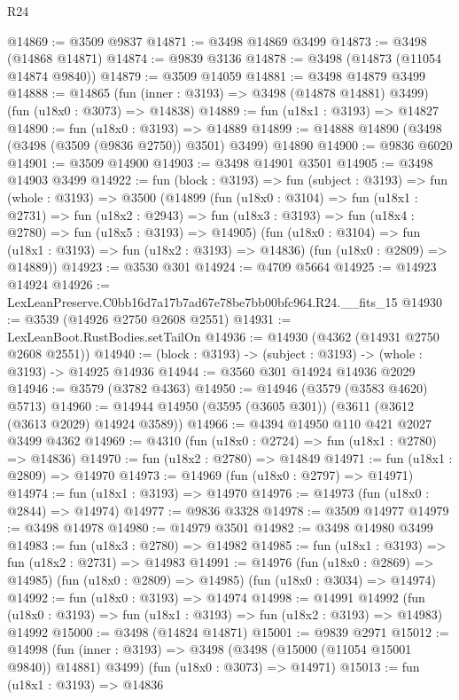 \begin{lexlean}{R24}
\begin{coremodule}
@14869 := @3509 @9837
@14871 := @3498 @14869 @3499
@14873 := @3498 (@14868 @14871)
@14874 := @9839 @3136
@14878 := @3498 (@14873 (@11054 @14874 @9840))
@14879 := @3509 @14059
@14881 := @3498 @14879 @3499
@14888 := @14865
    (fun (inner : @3193) => @3498 (@14878 @14881) @3499)
    (fun (u18x0 : @3073) => @14838)
@14889 := fun (u18x1 : @3193) => @14827
@14890 := fun (u18x0 : @3193) => @14889
@14899 := @14888 @14890 (@3498 (@3498 (@3509 (@9836 @2750)) @3501) @3499) @14890
@14900 := @9836 @6020
@14901 := @3509 @14900
@14903 := @3498 @14901 @3501
@14905 := @3498 @14903 @3499
@14922 := fun (block : @3193) =>
  fun (subject : @3193) =>
  fun (whole : @3193) =>
  @3500
    (@14899
      (fun (u18x0 : @3104) =>
      fun (u18x1 : @2731) =>
      fun (u18x2 : @2943) =>
      fun (u18x3 : @3193) => fun (u18x4 : @2780) => fun (u18x5 : @3193) => @14905)
      (fun (u18x0 : @3104) => fun (u18x1 : @3193) => fun (u18x2 : @3193) => @14836)
      (fun (u18x0 : @2809) => @14889))
@14923 := @3530 @301
@14924 := @4709 @5664
@14925 := @14923 @14924
@14926 := LexLeanPreserve.C0bb16d7a17b7ad67e78be7bb00bfc964.R24.__fits_15
@14930 := @3539 (@14926 @2750 @2608 @2551)
@14931 := LexLeanBoot.RustBodies.setTailOn
@14936 := @14930 (@4362 (@14931 @2750 @2608 @2551))
@14940 := (block : @3193) -> (subject : @3193) -> (whole : @3193) -> @14925 @14936
@14944 := @3560 @301 @14924 @14936 @2029
@14946 := @3579 (@3782 @4363)
@14950 := @14946 (@3579 (@3583 @4620) @5713)
@14960 := @14944 @14950 (@3595 (@3605 @301)) (@3611 (@3612 (@3613 @2029) @14924 @3589))
@14966 := @4394 @14950 @110 @421 @2027 @3499 @4362
@14969 := @4310 (fun (u18x0 : @2724) => fun (u18x1 : @2780) => @14836)
@14970 := fun (u18x2 : @2780) => @14849
@14971 := fun (u18x1 : @2809) => @14970
@14973 := @14969 (fun (u18x0 : @2797) => @14971)
@14974 := fun (u18x1 : @3193) => @14970
@14976 := @14973 (fun (u18x0 : @2844) => @14974)
@14977 := @9836 @3328
@14978 := @3509 @14977
@14979 := @3498 @14978
@14980 := @14979 @3501
@14982 := @3498 @14980 @3499
@14983 := fun (u18x3 : @2780) => @14982
@14985 := fun (u18x1 : @3193) => fun (u18x2 : @2731) => @14983
@14991 := @14976
    (fun (u18x0 : @2869) => @14985)
    (fun (u18x0 : @2809) => @14985)
    (fun (u18x0 : @3034) => @14974)
@14992 := fun (u18x0 : @3193) => @14974
@14998 := @14991
    @14992
    (fun (u18x0 : @3193) => fun (u18x1 : @3193) => fun (u18x2 : @3193) => @14983)
    @14992
@15000 := @3498 (@14824 @14871)
@15001 := @9839 @2971
@15012 := @14998
    (fun (inner : @3193) => @3498 (@3498 (@15000 (@11054 @15001 @9840)) @14881) @3499)
    (fun (u18x0 : @3073) => @14971)
@15013 := fun (u18x1 : @3193) => @14836

\end{coremodule}
\end{lexlean}
